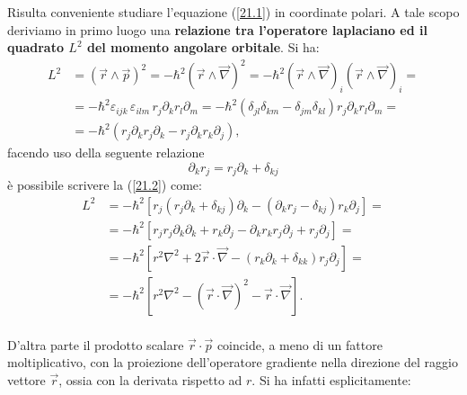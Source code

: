 Risulta conveniente studiare l'equazione (\ref{21.1}) in coordinate polari. A tale scopo deriviamo in primo luogo una \textbf{relazione tra l'operatore laplaciano ed il quadrato $L^2$ del momento angolare orbitale}. Si ha:
	\begin{align} 
	\label{21.2}
		L^2 & = \left(\vec{r}\wedge\vec{p}\right)^2=-\hbar^2\left(\vec{r}\wedge\vec{\nabla}\right)^2=-\hbar^2\left(\vec{r}\wedge\vec{\nabla}\right)_i\left(\vec{r}\wedge\vec{\nabla}\right)_i= \nonumber \\
		 & =  -\hbar^2\varepsilon_{ijk}\,\varepsilon_{ilm}\, r_j\partial_k r_l\partial_m= -\hbar^2\left(\delta_{jl}\delta_{km}-\delta_{jm}\delta_{kl}\right)r_j\partial_k r_l\partial_m=\nonumber \\
		 & =-\hbar^2\left(r_j\partial_kr_j\partial_k-r_j\partial_kr_k\partial_j\right) ,
\end{align}
facendo uso della seguente relazione
	\begin{equation}
		\partial_kr_j=r_j\partial_k+\delta_{kj}
	\end{equation}
è possibile scrivere la (\ref{21.2}) come:
	\begin{align}
	\label{21.3}
		L^2&=-\hbar^2\left[r_j\left(r_j\partial_k+\delta_{kj}\right)\partial_k-\left(\partial_kr_j-\delta_{kj}\right)r_k\partial_j\right]= \nonumber\\
		&=-\hbar^2\left[r_jr_j\partial_k\partial_k+r_k\partial_j-\partial_kr_kr_j\partial_j+r_j\partial_j\right]= \nonumber \\
		&=-\hbar^2\left[r^2\nabla^2+2\vec{r}\cdot\vec{\nabla}-\left(r_k\partial_k+\delta_{kk}\right)r_j\partial_j\right]= \nonumber\\
		&=-\hbar^2\left[r^2\nabla^2-\left(\vec{r}\cdot\vec{\nabla}\right)^2-\vec{r}\cdot\vec{\nabla}\right].
	\end{align}\\
D'altra parte il prodotto scalare $\vec{r}\cdot\vec{p}$ coincide, a meno di un fattore moltiplicativo, con la proiezione dell'operatore gradiente nella direzione del raggio vettore $\vec{r}$, ossia con la derivata rispetto ad $r$. Si ha infatti esplicitamente:
